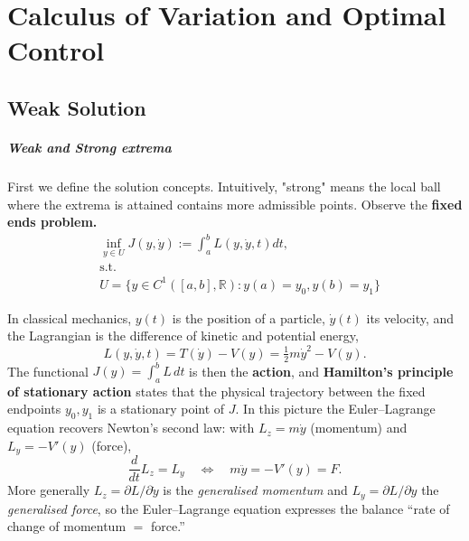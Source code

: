 \chapter{Calculus of Variation and Optimal Control}
\section{Weak Solution}
\paragraph{Weak and Strong extrema}
First we define the solution concepts. Intuitively, "strong" means the local ball where the extrema is attained contains more admissible points. 
Observe the \textbf{fixed ends problem.}
\begin{equation}\tag{(P1)}\label{prob:P1}
\begin{aligned}
	& \inf_{y \in U} J(y, \dot{y}):= \int_a^b L(y, \dot{y}, t) dt,  \\
	& \text{s.t.}\\
	& U = \{y \in C^1([a, b], \mathbb{R}) : y(a) = y_0, y(b) = y_1\}
\end{aligned}
\end{equation}

\begin{remark}
	In classical mechanics, $y(t)$ is the position of a particle, $\dot{y}(t)$ its velocity, and the Lagrangian is the difference of kinetic and potential energy,
	\begin{equation*}
		L(y, \dot{y}, t) = T(\dot{y}) - V(y) = \tfrac{1}{2}m\dot{y}^2 - V(y).
	\end{equation*}
	The functional $J(y) = \int_a^b L\, dt$ is then the \textbf{action}, and \textbf{Hamilton's principle of stationary action} states that the physical trajectory between the fixed endpoints $y_0, y_1$ is a stationary point of $J$. In this picture the Euler--Lagrange equation recovers Newton's second law: with $L_z = m\dot{y}$ (momentum) and $L_y = -V'(y)$ (force),
	\begin{equation*}
		\frac{d}{dt}L_z = L_y \quad\Longleftrightarrow\quad m\ddot{y} = -V'(y) = F.
	\end{equation*}
	More generally $L_z = \partial L / \partial \dot{y}$ is the \emph{generalised momentum} and $L_y = \partial L / \partial y$ the \emph{generalised force}, so the Euler--Lagrange equation expresses the balance ``rate of change of momentum $=$ force.''
\end{remark}

